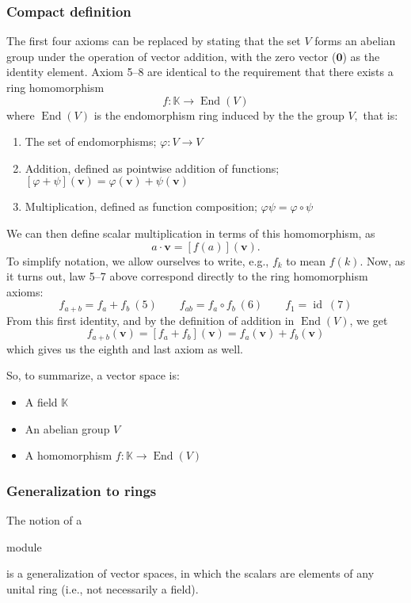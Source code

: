 \documentclass{article}
\DeclareMathOperator{\End}{End}
\DeclareMathOperator{\id}{id}
\newenvironment{itemized}{
\begin{itemize}
\setlength{\itemsep}{0pt}
\setlength{\parskip}{0pt}
\setlength{\parsep}{0pt}
}{\end{itemize}}
\newenvironment{enumerated}{
\begin{enumerate}
\setlength{\itemsep}{0pt}
\setlength{\parskip}{0pt}
\setlength{\parsep}{0pt}
}{\end{enumerate}}
\renewcommand{\vec}[1]{\mathbf{#1}}
\begin{document}
\subsubsection*{Compact definition}

The first four axioms can be replaced by stating that the set $V$ forms an abelian group under the operation of vector addition, with the zero vector ($\vec{0}$) as the identity element.
Axiom 5--8 are identical to the requirement that there exists a ring homomorphism
$$ f : \mathbb{K} \rightarrow \End(V) $$
where $\End(V)$ is the endomorphism ring induced by the the group $V,$ that is:
\begin{enumerated}
  \item The set of endomorphisms; $\varphi : V \rightarrow V$
  \item Addition, defined as pointwise addition of functions; $ \left[\varphi + \psi\right](\vec{v}) = \varphi(\vec{v}) + \psi(\vec{v})$
  \item Multiplication, defined as function composition; $ \varphi\psi = \varphi \circ \psi$
\end{enumerated}
We can then define scalar multiplication in terms of this homomorphism, as
$$ a \cdot \vec{v} = [f(a)](\vec{v}). $$
To simplify notation, we allow ourselves to write, e.g., $f_k$ to mean $f(k)$.
Now, as it turns out, law 5--7 above correspond directly to the ring homomorphism axioms:
$$
f_{a + b} = f_a + f_b \ (5) \quad \quad
f_{ab} = f_a \circ f_b \ (6) \quad \quad
f_1 = \id \ (7)
$$
From this first identity, and by the definition of addition in $\End(V)$, we get
$$ f_{a + b}(\vec{v}) = [f_a + f_b](\vec{v}) = f_a(\vec{v}) + f_b(\vec{v}) $$
which gives us the eighth and last axiom as well.

So, to summarize, a vector space is:
\begin{itemized}
  \item A field $\mathbb{K}$
  \item An abelian group $V$
  \item A homomorphism $f : \mathbb{K} \rightarrow \End(V)$
\end{itemized}

\subsubsection*{Generalization to rings}
The notion of a \begin{em}module\end{em} is a generalization of vector spaces, in which the scalars are elements of any unital ring (i.e., not necessarily a field).
\end{document}
